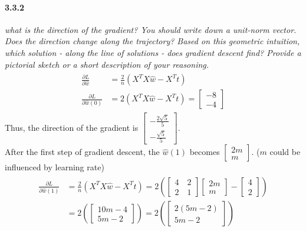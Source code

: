\documentclass{myhw}
\begin{document}
\begin{homeworkProblem}
\begin{homeworkSection}
\paragraph{3.3.2} \emph{what is the direction of the gradient? You should write down a unit-norm vector. Does the direction change along the trajectory? Based on this geometric intuition, which solution - along the line of solutions - does gradient descent find? Provide a pictorial sketch or a short description of your reasoning. } 
\begin{gather*}
\begin{aligned}
\frac{\partial L}{\partial \hat{w}} &= \frac{2}{n} (X^TX\hat{w} - X^Tt) \\
\frac{\partial L}{\partial \hat{w}(0)} &= 2 (X^TX\hat{w} - X^Tt) = \begin{bmatrix} -8 \\ -4 \end{bmatrix}
\end{aligned}
\end{gather*}
Thus, the direction of the gradient is 
$\begin{bmatrix} -\frac{2\sqrt{5}}{5} \\ -\frac{\sqrt{5}}{5} \end{bmatrix}$. \\ 
After the first step of gradient descent, the $\hat{w}(1)$ becomes $\begin{bmatrix} 2m \\ m \end{bmatrix}$. 
($m$ could be influenced by learning rate)
\begin{gather*}
\begin{aligned}
\frac{\partial L}{\partial \hat{w}(1)} &= \frac{2}{n} (X^TX\hat{w} - X^Tt) = 2 (\begin{bmatrix} 4 \quad 2 \\ 2 \quad 1 \end{bmatrix} \begin{bmatrix} 2m \\ m \end{bmatrix} - \begin{bmatrix} 4 \\ 2 \end{bmatrix} ) \\
&= 2 ( \begin{bmatrix} 10m-4 \\ 5m-2 \end{bmatrix} ) = 2 ( \begin{bmatrix} 2(5m-2) \\ 5m-2 \end{bmatrix} )

\end{aligned}
\end{gather*}
\end{homeworkSection}
\end{homeworkProblem}
\end{document}
